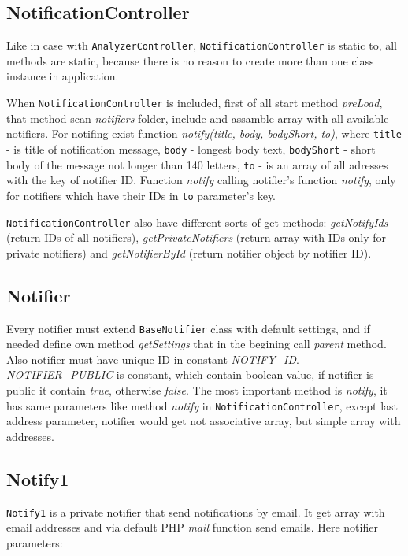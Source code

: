 \subsection{NotificationController}

Like in case with \texttt{AnalyzerController}, \texttt{NotificationController} is static to, all methods are static, because there is no reason to create more than one class instance in application.

When \texttt{NotificationController} is included, first of all start method \emph{preLoad}, that method scan \emph{notifiers} folder, include and assamble array with all available notifiers. For notifing exist function \emph{notify(title, body, bodyShort, to)}, where \texttt{title} - is title of notification message, \texttt{body} - longest body text, \texttt{bodyShort} - short body of the message not longer than 140 letters, \texttt{to} - is an array of all adresses with the key of notifier ID. Function \emph{notify} calling notifier's function \emph{notify}, only for notifiers which have their IDs in \texttt{to} parameter's key.

\texttt{NotificationController} also have different sorts of get methods: \emph{getNotifyIds} (return IDs of all notifiers), \emph{getPrivateNotifiers} (return array with IDs only for private notifiers) and \emph{getNotifierById} (return notifier object by notifier ID).

\subsection{Notifier}

Every notifier must extend \texttt{BaseNotifier} class with default settings, and if needed define own method \emph{getSettings} that in the begining call \emph{parent} method. Also notifier must have unique ID in constant \emph{NOTIFY\_ID}. \emph{NOTIFIER\_PUBLIC} is constant, which contain boolean value, if notifier is public it contain \emph{true}, otherwise \emph{false}. The most important method is \emph{notify}, it has same parameters like method \emph{notify} in \texttt{NotificationController}, except last address parameter, notifier would get not associative array, but simple array with addresses.

\subsection{Notify1}

\texttt{Notify1} is a private notifier that send notifications by email. It get array with email addresses and via default PHP \emph{mail} function send emails. Here notifier parameters:

